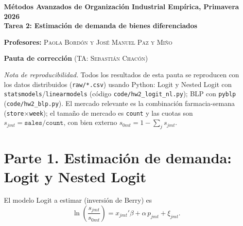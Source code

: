 \documentclass[answers]{exam}
\begin{document}
\begin{center}
\textbf{\large{M\'etodos Avanzados de Organizaci\'on Industrial Emp\'irica, Primavera 2026}} \\
\textbf{\large{Tarea 2: Estimaci\'on de demanda de bienes diferenciados}}

\medskip
\textbf{Profesores:} \textsc{Paola Bord\'on y Jos\'e Manuel Paz y Mi\~no}

\textbf{Pauta de correcci\'on} (TA: \textsc{Sebasti\'an Chac\'on})
\end{center}
\vspace{4mm}

\textit{Nota de reproducibilidad.} Todos los resultados de esta pauta se reproducen con los datos
distribuidos (\texttt{raw/*.csv}) usando Python: Logit y Nested Logit con
\texttt{statsmodels}/\texttt{linearmodels} (c\'odigo \texttt{code/hw2\_logit\_nl.py}); BLP con
\texttt{pyblp} (\texttt{code/hw2\_blp.py}). El mercado relevante es la combinaci\'on
farmacia-semana (\texttt{store}$\times$\texttt{week}); el tama\~no de mercado es \texttt{count} y las
cuotas son $s_{jmt}=\texttt{sales}/\texttt{count}$, con bien externo
$s_{0mt}=1-\sum_j s_{jmt}$.

\section*{Parte 1. Estimaci\'on de demanda: Logit y Nested Logit}

El modelo Logit a estimar (inversi\'on de Berry) es
\[
\ln\!\left(\frac{s_{jmt}}{s_{0mt}}\right)=x_{jmt}'\beta+\alpha\,p_{jmt}+\xi_{jmt}.
\]
\end{document}
